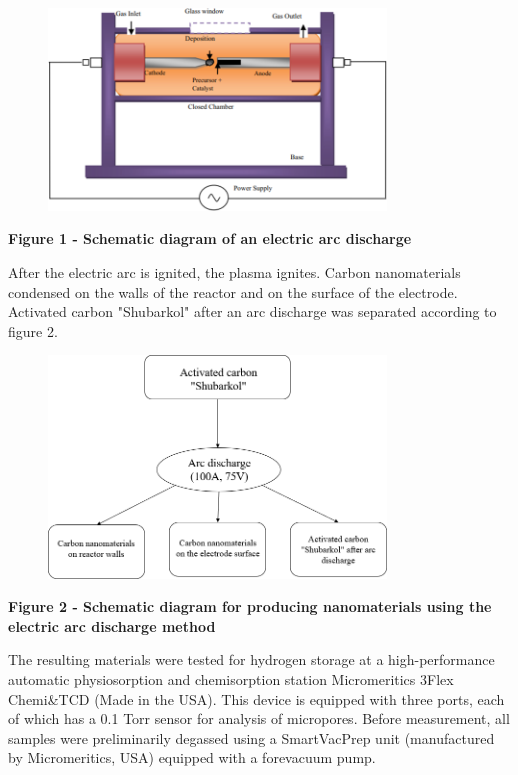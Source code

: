 \begin{figure}[H]
	\centering
	\includegraphics[width=0.8\textwidth]{assets/53}
	\caption*{}
\end{figure}

{\bfseries Figure 1 - Schematic diagram of an electric arc discharge}

After the electric arc is ignited, the plasma ignites. Carbon
nanomaterials condensed on the walls of the reactor and on the surface
of the electrode. Activated carbon "Shubarkol" after an arc discharge
was separated according to figure 2.

\begin{figure}[H]
	\centering
	\includegraphics[width=0.8\textwidth]{assets/54}
	\caption*{}
\end{figure}

{\bfseries Figure 2 - Schematic diagram for producing nanomaterials using
the electric arc discharge method}

The resulting materials were tested for hydrogen storage at a
high-performance automatic physiosorption and chemisorption station
Micromeritics 3Flex Chemi\&TCD (Made in the USA). This device is
equipped with three ports, each of which has a 0.1 Torr sensor for
analysis of micropores. Before measurement, all samples were
preliminarily degassed using a SmartVacPrep unit (manufactured by
Micromeritics, USA) equipped with a forevacuum pump.

